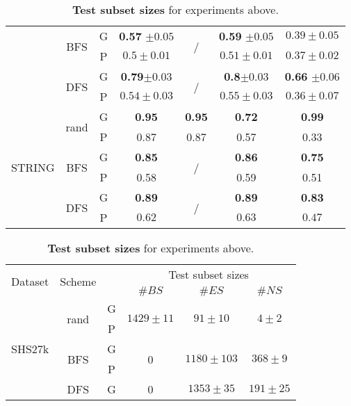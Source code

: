 \begin{table}[h]
\begin{tabular}{ccccccc}
        & \multirow{2}{*}{BFS}   & G  &  \textbf{0.57} $\pm 0.05 $&   \multirow{2}{*}{/} &  \textbf{0.59} $\pm 0.05 $&  $0.39 \pm 0.05$ \\
        & & P & $0.5 \pm 0.01 $&    &  $0.51 \pm 0.01 $&  $0.37 \pm 0.02 $\\
        & \multirow{2}{*}{DFS}   & G  &  \textbf{0.79}$ \pm 0.03 $&   \multirow{2}{*}{/} &   \textbf{0.8}$ \pm 0.03$ &  \textbf{0.66} $\pm 0.06 $\\
        & & P & $0.54 \pm 0.03 $&  &  $0.55 \pm 0.03 $&  $0.36 \pm 0.07 $\\
        \midrule
        \multirow{6}{*}{STRING} & \multirow{2}{*}{rand} & G &   \textbf{0.95} &   \textbf{0.95} &  \textbf{0.72} &  \textbf{0.99}  \\
        & & P & 0.87 & 0.87 & 0.57 & 0.33 \\
        & \multirow{2}{*}{BFS}  & G   &  \textbf{0.85} &   \multirow{2}{*}{/} &  \textbf{0.86} &  \textbf{0.75} \\
        & & P & 0.58 & & 0.59 & 0.51 \\
        & \multirow{2}{*}{DFS}  & G   &  \textbf{0.89} &   \multirow{2}{*}{/} &   \textbf{0.89} &  \textbf{0.83}\\
        & & P & $0.62$ & & $0.63$ & $0.47$ \\
        \bottomrule
    \end{tabular}
    \vspace{6pt}
    \caption{\label{subsets} \textbf{Test subset sizes} for experiments above.}
    \centering
    \begin{tabular}{cccccc}
    \toprule
    \multirow{2}{*}[-3pt]{Dataset} & \multirow{2}{*}[-3pt]{Scheme} &
    \multirow{2}{*}{} & \multicolumn{3}{c}{Test subset sizes} \\ 
            \cmidrule(l{3pt}r{3pt}){4-6}
      & &  &  $\#BS$  &     $\#ES$ &    $\#NS$ \\
    \midrule
    \multirow{6}{*}{SHS27k} & \multirow{2}{*}{rand} & G &  \multirow{2}{*}{$1429 \pm 11$} &      \multirow{2}{*}{$91 \pm 10$} &       \multirow{2}{*}{$4 \pm 2$} \\
    & & P &  &\\
    &\multirow{2}{*}{BFS}  & G   &       \multirow{2}{*}{0} &  \multirow{2}{*}{$1180 \pm 103$} &    \multirow{2}{*}{$368 \pm 9$} \\
    & & P &  & \\
    &\multirow{2}{*}{DFS}   & G   &       \multirow{2}{*}{0} &   \multirow{2}{*}{$1353 \pm 35$} &    \multirow{2}{*}{$191 \pm 25$} \\

\end{tabular}
\end{table}
